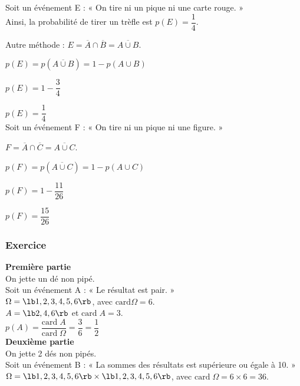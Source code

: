 Soit un événement E : « On tire ni un pique ni une carte rouge. » \\  Ainsi, la probabilité de tirer un trèfle est $p\left(E\right) = \dfrac{1}{4} $.

Autre méthode : $E = \overline{A} \cap \overline{B} = \overline{A \cup B}$. 

$p\left(E\right) = p\left(\overline{A\cup B}\right) = 1 - p\left(A \cup B\right) $

$p\left(E\right) = 1 - \dfrac{3}{4} $ 

$p\left(E\right) = \dfrac{1}{4} $ \\

Soit un événement F : « On tire ni un pique ni une figure. »

$F = \overline{A} \cap \overline{C} = \overline{A \cup C}$. 

$p\left(F\right) = p\left(\overline{A\cup C}\right) = 1 - p\left(A \cup C\right) $ 

$p\left(F\right) = 1 - \dfrac{11}{26} $ 

$p\left(F\right) = \dfrac{15}{26} $ 

\newpage

\subsubsection{Exercice }

\textbf{Première partie} \\

On jette un dé non pipé. \\ Soit un événement A : « Le résultat est pair. » \\

$\Omega = \lb 1,2,3,4,5,6 \rb $, avec $\mathrm{card} \Omega = 6$. \\

$ A = \lb 2,4,6 \rb $ et $ \mathrm{card} \; A = 3$. \\

$p\left(A\right) = \dfrac{\mathrm{card} \; A}{\mathrm{card} \; \Omega} = \dfrac{3}{6} = \dfrac{1}{2} $ \\

\textbf{Deuxième partie} \\

On jette 2 dés non pipés. \\ Soit un événement B : « La sommes des résultats est supérieure ou égale à 10. » \\

$\Omega = \lb 1,2,3,4,5,6 \rb \times \lb 1,2,3,4,5,6 \rb$, avec $\mathrm{card} \; \Omega = 6 \times 6 = 36$. \\


